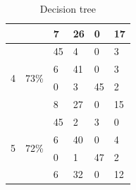 \documentclass[USenglish]{ifimaster}  %
\begin{document}
\begin{table}[h]
\begin{tabular}{@{}llllll@{}}
			\multicolumn{1}{l|}{} & \multicolumn{1}{l|}{} & \multicolumn{1}{l|}{7} & \multicolumn{1}{l|}{26} & \multicolumn{1}{l|}{0} & 17 \\ \midrule
			\multicolumn{1}{l|}{\multirow{4}{*}{4}} & \multicolumn{1}{l|}{\multirow{4}{*}{73\%}} & \multicolumn{1}{l|}{45} & \multicolumn{1}{l|}{4} & \multicolumn{1}{l|}{0} & 3 \\ \cmidrule(l){3-6} 
			\multicolumn{1}{l|}{} & \multicolumn{1}{l|}{} & \multicolumn{1}{l|}{6} & \multicolumn{1}{l|}{41} & \multicolumn{1}{l|}{0} & 3 \\ \cmidrule(l){3-6} 
			\multicolumn{1}{l|}{} & \multicolumn{1}{l|}{} & \multicolumn{1}{l|}{0} & \multicolumn{1}{l|}{3} & \multicolumn{1}{l|}{45} & 2 \\ \cmidrule(l){3-6} 
			\multicolumn{1}{l|}{} & \multicolumn{1}{l|}{} & \multicolumn{1}{l|}{8} & \multicolumn{1}{l|}{27} & \multicolumn{1}{l|}{0} & 15 \\ \midrule
			\multicolumn{1}{l|}{\multirow{4}{*}{5}} & \multicolumn{1}{l|}{\multirow{4}{*}{72\%}} & \multicolumn{1}{l|}{45} & \multicolumn{1}{l|}{2} & \multicolumn{1}{l|}{3} & 0 \\ \cmidrule(l){3-6} 
			\multicolumn{1}{l|}{} & \multicolumn{1}{l|}{} & \multicolumn{1}{l|}{6} & \multicolumn{1}{l|}{40} & \multicolumn{1}{l|}{0} & 4 \\ \cmidrule(l){3-6} 
			\multicolumn{1}{l|}{} & \multicolumn{1}{l|}{} & \multicolumn{1}{l|}{0} & \multicolumn{1}{l|}{1} & \multicolumn{1}{l|}{47} & 2 \\ \cmidrule(l){3-6} 
			\multicolumn{1}{l|}{} & \multicolumn{1}{l|}{} & \multicolumn{1}{l|}{6} & \multicolumn{1}{l|}{32} & \multicolumn{1}{l|}{0} & 12 \\ \bottomrule
		\end{tabular}
		\caption{Decision tree}
		\label{dt4}
	\end{table}
	\FloatBarrier
	
\end{document}
